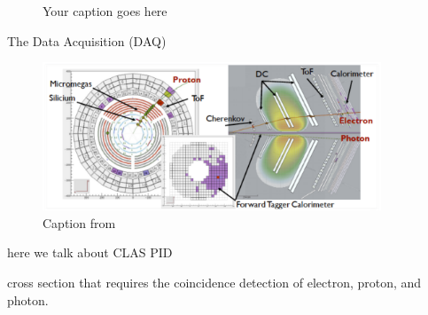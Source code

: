     \begin{figure}[H]
        \centering
        \caption{Your caption goes here}
        \label{fig:clas12-pid-overview}
    \end{figure}

    
The Data Acquisition (DAQ) \parencite{Boyarinov2020TheSystem} 

\begin{figure}
    \centering
    \includegraphics[width=0.9\textwidth]{Chapters/Ch2-Experiment/recon_pid/pid_figs/example_track.png}
    \caption{Caption from \parencite{Battaglieri2021PresentProgram}}
    \label{fig:example-track}
\end{figure}


here we talk about CLAS PID




cross section that requires the coincidence detection of electron, proton,
and photon.

